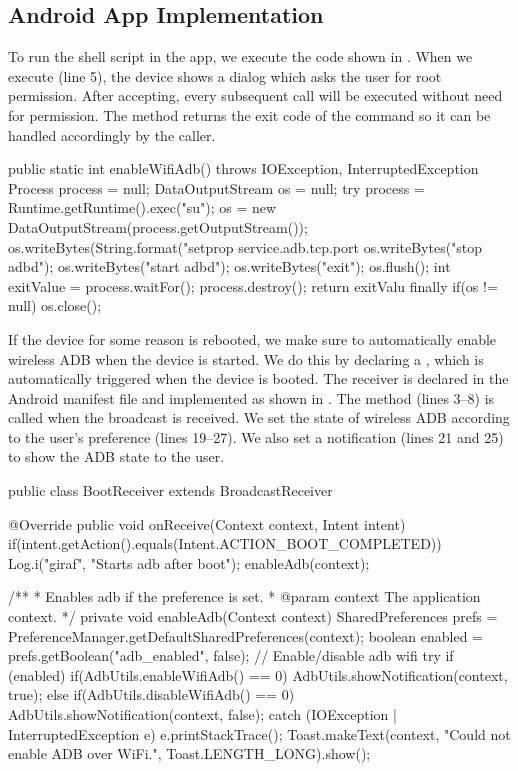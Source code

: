 \subsection{Android App Implementation}
To run the shell script in the app, we execute the code shown in . When we execute  (line 5), the device shows a dialog which asks the user for root permission. After accepting, every subsequent  call will be executed without need for permission. The method returns the exit code of the command so it can be handled accordingly by the caller.
\begin{javacode}[float,label=lst:android_app_shell,caption=Enable wireless ADB in Android]
public static int enableWifiAdb() throws IOException, InterruptedException {
  Process process = null;
  DataOutputStream os = null;
  try {
    process = Runtime.getRuntime().exec("su");
    os = new DataOutputStream(process.getOutputStream());
    os.writeBytes(String.format("setprop service.adb.tcp.port %
    os.writeBytes("stop adbd\n");
    os.writeBytes("start adbd\n");
    os.writeBytes("exit\n");
    os.flush();
    int exitValue = process.waitFor();
    process.destroy();
    return exitValu
  } finally {
    if(os != null) {
      os.close();
    }
  }
}
\end{javacode}
If the device for some reason is rebooted, we make sure to automatically enable wireless ADB when the device is started. We do this by declaring a , which is automatically triggered when the device is booted. The receiver is declared in the Android manifest file and implemented as shown in . The  method (lines 3--8) is called when the broadcast is received. We set the state of wireless ADB according to the user's preference (lines 19--27). We also set a notification (lines 21 and 25) to show the ADB state to the user.

\begin{javacode}[float,label=lst:android_app_broadcast_receiver,caption=Android boot broadcast receiver]
public class BootReceiver extends BroadcastReceiver {
  @Override
  public void onReceive(Context context, Intent intent) {
    if(intent.getAction().equals(Intent.ACTION_BOOT_COMPLETED)) {
      Log.i("giraf", "Starts adb after boot");
      enableAdb(context);
    }
  }


  /**
  * Enables adb if the preference is set.
  * @param context The application context.
  */
  private void enableAdb(Context context) {
    SharedPreferences prefs = PreferenceManager.getDefaultSharedPreferences(context);
    boolean enabled = prefs.getBoolean("adb_enabled", false);
    // Enable/disable adb wifi
    try {
      if (enabled) {
        if(AdbUtils.enableWifiAdb() == 0) {
          AdbUtils.showNotification(context, true);
        }
      } else {
        if(AdbUtils.disableWifiAdb() == 0) {
          AdbUtils.showNotification(context, false);
        }
      }
    } catch (IOException | InterruptedException e) {
      e.printStackTrace();
      Toast.makeText(context, "Could not enable ADB over WiFi.", Toast.LENGTH_LONG).show();
    }
  }
}
\end{javacode}


